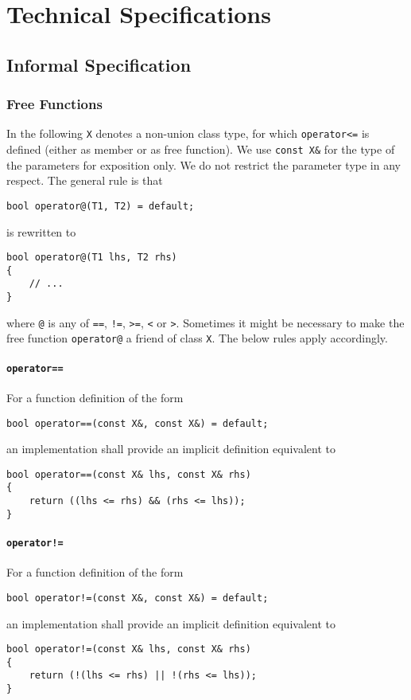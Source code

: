 ﻿\documentclass[a4paper,11pt,twoside,final]{article}
\numberwithin{equation}{subsection}
\begin{document}
\section{Technical Specifications}
\subsection{Informal Specification}
\subsubsection{Free Functions}
In the following \verb|X| denotes a non-union class type, for which \verb|operator<=| is defined (either as member or as free function). We use \verb|const X&| for the type of the parameters for exposition only. We do not restrict the parameter type in any respect. The general rule is that
\begin{verbatim}
bool operator@(T1, T2) = default;
\end{verbatim}
is rewritten to
\begin{verbatim}
bool operator@(T1 lhs, T2 rhs)
{
    // ...
}
\end{verbatim}
where \verb|@| is any of \verb|==|, \verb|!=|, \verb|>=|, \verb|<| or \verb|>|. Sometimes it might be necessary to make the free function \verb|operator@| a friend of class \verb|X|. The below rules apply accordingly.

\paragraph{\texttt{operator==}}
For a function definition of the form
\begin{verbatim}
bool operator==(const X&, const X&) = default;
\end{verbatim}
an implementation shall provide an implicit definition equivalent to
\begin{verbatim}
bool operator==(const X& lhs, const X& rhs)
{
    return ((lhs <= rhs) && (rhs <= lhs));
}
\end{verbatim}

\paragraph{\texttt{operator!=}}
For a function definition of the form
\begin{verbatim}
bool operator!=(const X&, const X&) = default;
\end{verbatim}
an implementation shall provide an implicit definition equivalent to
\begin{verbatim}
bool operator!=(const X& lhs, const X& rhs)
{
    return (!(lhs <= rhs) || !(rhs <= lhs));
}
\end{verbatim}
\end{document}
